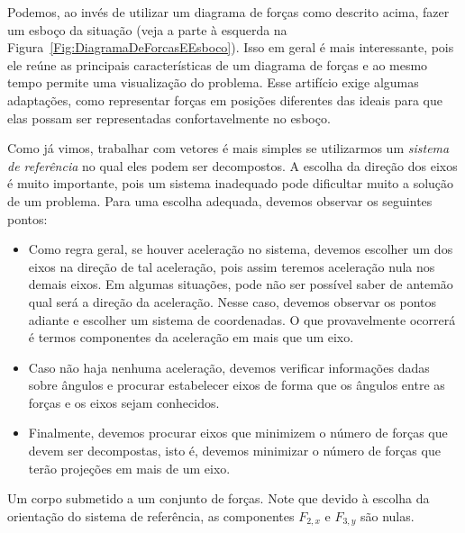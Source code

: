Podemos, ao invés de utilizar um diagrama de forças como descrito acima, fazer um esboço da situação (veja a parte à esquerda na Figura~\ref{Fig:DiagramaDeForcasEEsboco}). Isso em geral é mais interessante, pois ele reúne as principais características de um diagrama de forças e ao mesmo tempo permite uma visualização do problema. Esse artifício exige algumas adaptações, como representar forças em posições diferentes das ideais para que elas possam ser representadas confortavelmente no esboço.

Como já vimos, trabalhar com vetores é mais simples se utilizarmos um \emph{sistema de referência} no qual eles podem ser decompostos. A escolha da direção dos eixos é muito importante, pois um sistema inadequado pode dificultar muito a solução de um problema. Para uma escolha adequada, devemos observar os seguintes pontos:
\begin{itemize}
    \item Como regra geral, se houver aceleração no sistema, devemos escolher um dos eixos na direção de tal aceleração, pois assim teremos aceleração nula nos demais eixos. Em algumas situações, pode não ser possível saber de antemão qual será a direção da aceleração. Nesse caso, devemos observar os pontos adiante e escolher um sistema de coordenadas. O que provavelmente ocorrerá é termos componentes da aceleração em mais que um eixo.
    \item Caso não haja nenhuma aceleração, devemos verificar informações dadas sobre ângulos e procurar estabelecer eixos de forma que os ângulos entre as forças e os eixos sejam conhecidos.
    \item Finalmente, devemos procurar eixos que minimizem o número de forças que devem ser decompostas, isto é, devemos minimizar o número de forças que terão projeções em mais de um eixo.
\end{itemize}

\begin{marginfigure}[3cm]
\centering
{}
\caption{Um corpo submetido a um conjunto de forças. Note que devido à escolha da orientação do sistema de referência, as componentes $F_{2, x}$ e $F_{3, y}$ são nulas.\label{Fig:ExemploSisRefDecompForcas}}
\end{marginfigure}


